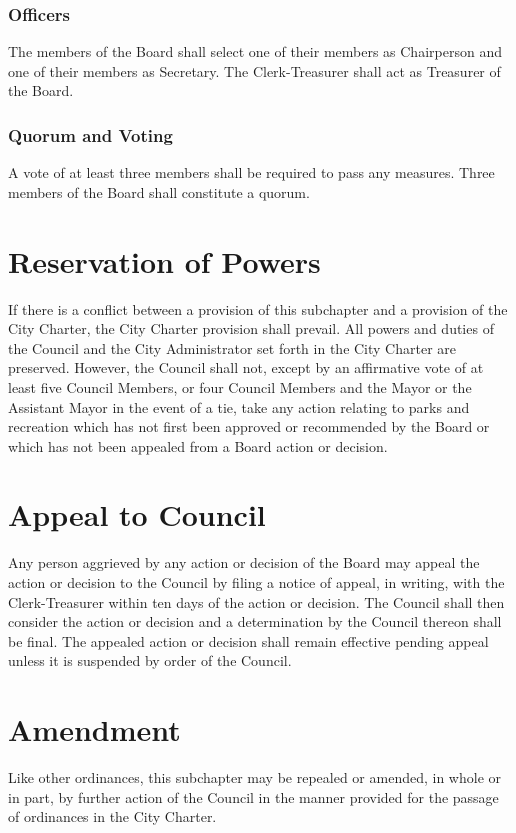 \subsubsection{Officers}
The members of the Board shall select one of their members as Chairperson and one of their members as Secretary.  The Clerk-Treasurer shall act as Treasurer of the Board.
\subsubsection{Quorum and Voting}
A vote of at least three members shall be required to pass any measures.  Three members of the Board shall constitute a quorum.

\section{Reservation of Powers}
If there is a conflict between a provision of this subchapter and a provision of the City Charter, the City Charter provision shall prevail.  All powers and duties of the Council and the City Administrator set forth in the City Charter are preserved. However, the Council shall not, except by an affirmative vote of at least five Council Members, or four Council Members and the Mayor or the Assistant Mayor in the event of a tie, take any action relating to parks and recreation which has not first been approved or recommended by the Board or which has not been appealed from a Board action or decision.

\section{Appeal to Council}
Any person aggrieved by any action or decision of the Board may appeal the action or decision to the Council by filing a notice of appeal, in writing, with the Clerk-Treasurer within ten days of the action or decision.  The Council shall then consider the action or decision and a determination by the Council thereon shall be final.  The appealed action or decision shall remain effective pending appeal unless it is suspended by order of the Council.

\section{Amendment}
Like other ordinances, this subchapter may be repealed or amended, in whole or in part, by further action of the Council in the manner provided for the passage of ordinances in the City Charter.

